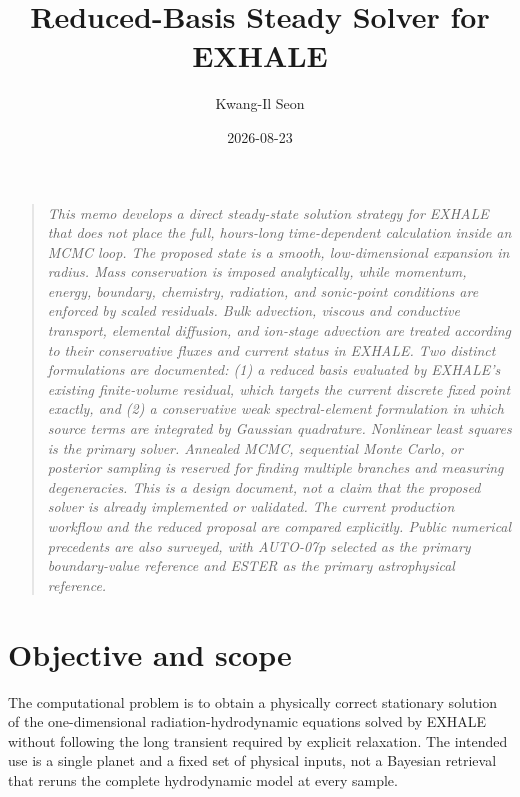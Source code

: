 \documentclass[english,a4paper]{my_memo}
\title{Reduced-Basis Steady Solver for EXHALE}
\author{Kwang-Il Seon}
\date{2026-08-23}
\begin{document}
\maketitle

\begin{quote}\small\itshape
This memo develops a direct steady-state solution strategy for EXHALE that
does not place the full, hours-long time-dependent calculation inside an
MCMC loop.  The proposed state is a smooth, low-dimensional expansion in
radius.  Mass conservation is imposed analytically, while momentum, energy,
boundary, chemistry, radiation, and sonic-point conditions are enforced by
scaled residuals.  Bulk advection, viscous and conductive transport, elemental
diffusion, and ion-stage advection are treated according to their conservative
fluxes and current status in EXHALE.  Two distinct formulations are documented:
(1) a reduced
basis evaluated by EXHALE's existing finite-volume residual, which targets
the current discrete fixed point exactly, and (2) a conservative weak
spectral-element formulation in which source terms are integrated by Gaussian
quadrature.  Nonlinear least squares is the primary solver.  Annealed MCMC,
sequential Monte Carlo, or posterior sampling is reserved for finding multiple
branches and measuring degeneracies.  This is a design document, not a claim
that the proposed solver is already implemented or validated.  The current
production workflow and the reduced proposal are compared explicitly.  Public
numerical precedents are also surveyed, with AUTO-07p selected as the primary
boundary-value reference and ESTER as the primary astrophysical reference.
\end{quote}

\tableofcontents
\bigskip

\section{Objective and scope}\label{sec:objective}

The computational problem is to obtain a physically correct stationary
solution of the one-dimensional radiation-hydrodynamic equations solved by
EXHALE without following the long transient required by explicit relaxation.
The intended use is a single planet and a fixed set of physical inputs, not a
Bayesian retrieval that reruns the complete hydrodynamic model at every sample.
\end{document}
